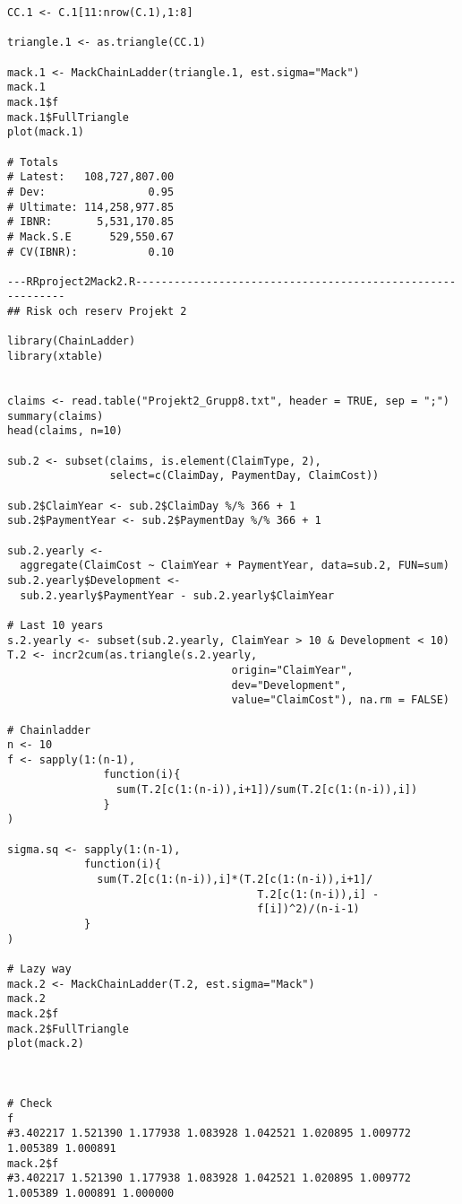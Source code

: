 \documentclass[a4paper]{article}
\begin{document}
{\begin{verbatim}
CC.1 <- C.1[11:nrow(C.1),1:8]

triangle.1 <- as.triangle(CC.1)

mack.1 <- MackChainLadder(triangle.1, est.sigma="Mack")
mack.1
mack.1$f
mack.1$FullTriangle
plot(mack.1)

# Totals
# Latest:   108,727,807.00
# Dev:                0.95
# Ultimate: 114,258,977.85
# IBNR:       5,531,170.85
# Mack.S.E      529,550.67
# CV(IBNR):           0.10

---RRproject2Mack2.R-----------------------------------------------------------
## Risk och reserv Projekt 2

library(ChainLadder)
library(xtable)


claims <- read.table("Projekt2_Grupp8.txt", header = TRUE, sep = ";")
summary(claims)
head(claims, n=10)

sub.2 <- subset(claims, is.element(ClaimType, 2),
                select=c(ClaimDay, PaymentDay, ClaimCost))

sub.2$ClaimYear <- sub.2$ClaimDay %/% 366 + 1
sub.2$PaymentYear <- sub.2$PaymentDay %/% 366 + 1

sub.2.yearly <- 
  aggregate(ClaimCost ~ ClaimYear + PaymentYear, data=sub.2, FUN=sum)
sub.2.yearly$Development <-
  sub.2.yearly$PaymentYear - sub.2.yearly$ClaimYear

# Last 10 years
s.2.yearly <- subset(sub.2.yearly, ClaimYear > 10 & Development < 10)
T.2 <- incr2cum(as.triangle(s.2.yearly,
                                   origin="ClaimYear",
                                   dev="Development",
                                   value="ClaimCost"), na.rm = FALSE)

# Chainladder
n <- 10
f <- sapply(1:(n-1),
               function(i){
                 sum(T.2[c(1:(n-i)),i+1])/sum(T.2[c(1:(n-i)),i])
               }
)

sigma.sq <- sapply(1:(n-1),
            function(i){
              sum(T.2[c(1:(n-i)),i]*(T.2[c(1:(n-i)),i+1]/
                                       T.2[c(1:(n-i)),i] -
                                       f[i])^2)/(n-i-1)
            }
)

# Lazy way
mack.2 <- MackChainLadder(T.2, est.sigma="Mack")
mack.2
mack.2$f
mack.2$FullTriangle
plot(mack.2)



# Check
f
#3.402217 1.521390 1.177938 1.083928 1.042521 1.020895 1.009772 1.005389 1.000891
mack.2$f
#3.402217 1.521390 1.177938 1.083928 1.042521 1.020895 1.009772 1.005389 1.000891 1.000000


\end{verbatim}}
\end{document}
